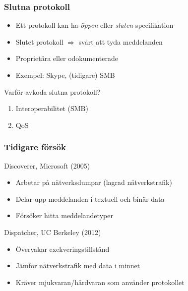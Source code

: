 \documentclass[xetex]{beamer}
\begin{document}
    \begin{frame}
        \frametitle{Slutna protokoll}
        \begin{itemize}
            \item Ett protokoll kan ha \emph{öppen} eller \emph{sluten}
                specifikation
            \item Slutet protokoll $\Rightarrow$ svårt att tyda meddelanden
            \item Proprietära eller odokumenterade
            \item Exempel: Skype, (tidigare) SMB
        \end{itemize}
        \vskip20pt
        Varför avkoda slutna protokoll?
        \begin{enumerate}
            \item Interoperabilitet (SMB)
            \item QoS
        \end{enumerate}
    \end{frame}
    \begin{frame}
        \frametitle{Tidigare försök}
        Discoverer, Microsoft (2005)
        \begin{itemize}
            \item Arbetar på nätverksdumpar (lagrad nätverkstrafik)
            \item Delar upp meddelanden i textuell och binär data
            \item Försöker hitta meddelandetyper
        \end{itemize}
        \vskip20pt
        Dispatcher, UC Berkeley (2012)
        \begin{itemize}
            \item Övervakar exekveringstillstånd
            \item Jämför nätverkstrafik med data i minnet
            \item Kräver mjukvaran/hårdvaran som använder protokollet
        \end{itemize}
    \end{frame}
\end{document}
